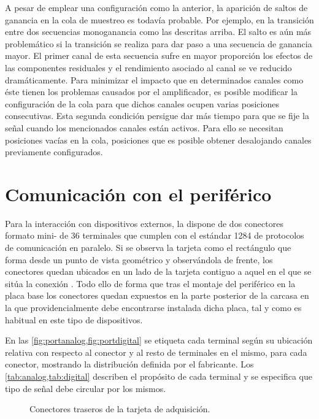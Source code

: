 A pesar de emplear una configuración como la anterior, la aparición de
saltos de ganancia en la cola de muestreo es todavía probable. Por ejemplo,
en la transición entre dos secuencias monoganancia como las descritas
arriba. El salto es aún más problemático si la transición se realiza para
dar paso a una secuencia de ganancia mayor. El primer canal de esta
secuencia sufre en mayor proporción los efectos de las componentes
residuales y el rendimiento asociado al canal se ve reducido
dramáticamente. Para minimizar el impacto que en determinados canales como
éste tienen los problemas causados por el amplificador, es posible
modificar la configuración de la cola para que dichos canales ocupen varias
posiciones consecutivas. Esta segunda condición persigue dar más tiempo
para que se fije la señal cuando los mencionados canales están activos.
Para ello se necesitan posiciones vacías en la cola, posiciones que es
posible obtener desalojando canales previamente configurados.


\section{Comunicación con el periférico}

Para la interacción con dispositivos externos, la \kpci{} dispone de dos
conectores formato mini- de 36 terminales que cumplen con el
estándar  1284 de protocolos de comunicación en paralelo. Si se
observa la tarjeta como el rectángulo que forma desde un punto de vista
geométrico y observándola de frente, los conectores quedan ubicados en un
lado de la tarjeta contiguo a aquel en el que se sitúa la conexión
. Todo ello de forma que tras el montaje del periférico en la
placa base los conectores quedan expuestos en la parte posterior de la
carcasa en la que providencialmente debe encontrarse instalada dicha placa,
tal y como es habitual en este tipo de dispositivos.

En las \cref{fig:portanalog,fig:portdigital} se etiqueta cada terminal
según su ubicación relativa con respecto al conector y al resto de
terminales en el mismo, para cada conector, mostrando la distribución
definida por el fabricante. Los \cref{tab:analog,tab:digital} describen el
propósito de cada terminal y se especifica que tipo de señal debe circular
por los mismos.

\begin{figure}
	\begin{center}
			\vspace*{.1\textheight}
	\end{center}
	\caption[Conectores traseros de la tarjeta de adquisición]
	{Conectores traseros de la tarjeta de adquisición.}
	\label{fig:ports}
\end{figure}

